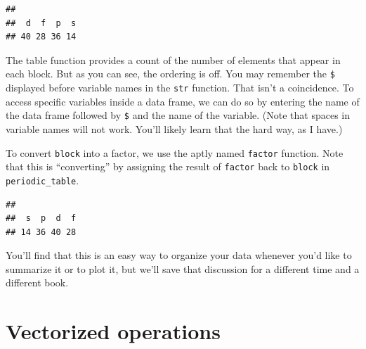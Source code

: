 \documentclass[]{tufte-book}
\newenvironment{Shaded}{\begin{snugshade}}{\end{snugshade}}
\newcommand{\AttributeTok}[1]{\textcolor[rgb]{0.77,0.63,0.00}{#1}}
\newcommand{\FunctionTok}[1]{\textcolor[rgb]{0.00,0.00,0.00}{#1}}
\newcommand{\NormalTok}[1]{#1}
\newcommand{\OtherTok}[1]{\textcolor[rgb]{0.56,0.35,0.01}{#1}}
\newcommand{\SpecialCharTok}[1]{\textcolor[rgb]{0.00,0.00,0.00}{#1}}
\newcommand{\StringTok}[1]{\textcolor[rgb]{0.31,0.60,0.02}{#1}}
\begin{document}
\begin{verbatim}
## 
##  d  f  p  s 
## 40 28 36 14
\end{verbatim}

The table function provides a count of the number of elements that appear in each block. But as you can see, the ordering is off. You may remember the \texttt{\$} displayed before variable names in the \texttt{str} function. That isn't a coincidence. To access specific variables inside a data frame, we can do so by entering the name of the data frame followed by \texttt{\$} and the name of the variable. (Note that spaces in variable names will not work. You'll likely learn that the hard way, as I have.)

To convert \texttt{block} into a factor, we use the aptly named \texttt{factor} function. Note that this is ``converting'' by assigning the result of \texttt{factor} back to \texttt{block} in \texttt{periodic\_table}.

\begin{Shaded}
\end{Shaded}

\begin{Shaded}
\end{Shaded}

\begin{verbatim}
## 
##  s  p  d  f 
## 14 36 40 28
\end{verbatim}

You'll find that this is an easy way to organize your data whenever you'd like to summarize it or to plot it, but we'll save that discussion for a different time and a different book.

\hypertarget{vectorized-operations}{%
\section{Vectorized operations}\label{vectorized-operations}}
\end{document}
